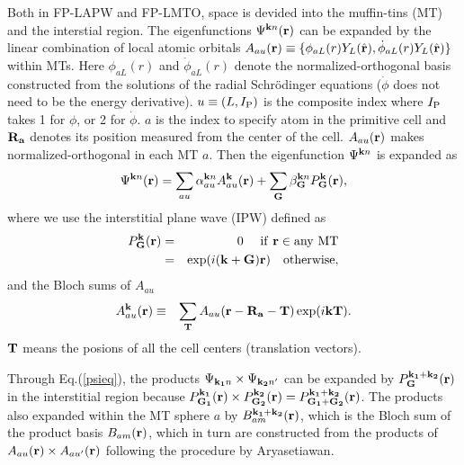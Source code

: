 \documentclass[a4paper,10pt,epsf,fleqn]{article}
\begin{document}
Both in FP-LAPW and FP-LMTO, space is devided into
the muffin-tins (MT) and the interstial region.
The eigenfunctions $\Psi^{{\bf k}n}({\bf r})$ can be
expanded by the linear combination of local atomic orbitals
$A_{au}({\bf r}) \equiv \{ \phi_{aL}(r) Y_L(\hat{\bf r}),\dot{\phi}_{aL}(r) Y_L(\hat{\bf r}) \}$
within MTs.
Here $\phi_{aL}(r)$ and $\dot{\phi}_{aL}(r)$ denote 
the normalized-orthogonal basis 
constructed from the solutions of the radial Schr\"odinger equations
($\dot{\phi}$ does not need to be the energy derivative).
$u \equiv(L, I_{\rm P})$ is the composite index
where $I_{\rm P}$ takes 1 for $\phi$, or 2 for $\dot{\phi}$.
$a$ is the index to specify atom in the primitive cell and
${\bf R_a}$ denotes its position measured from the center of the cell.
$A_{au}({\bf r})$ makes normalized-orthogonal in each MT $a$.
Then the eigenfunction $\Psi^{{\bf k}n}$ is expanded as
\begin{eqnarray}
\label{eigenfunction}
\label{psieq}
\Psi^{{\bf k}n}({\bf r}) 
= \sum_{a u} \alpha^{{\bf k} n}_{au} A^{\bf k}_{a u}({\bf r})
 + \sum_{\bf G} \beta^{{\bf k}n}_{\bf G} P^{\bf k}_{\bf G}({\bf r}),
\end{eqnarray}
where we use the interstitial plane wave (IPW) defined as
\begin{eqnarray}
P^{\bf k}_{\bf G}({\bf r}) &=& 0  \ \ \ {\rm \ if \ {\bf r} \in any \ MT} \nonumber \\
        &=&   \exp (i ({\bf k+G}) {\bf r}) \ \ \ {\rm otherwise},
\end{eqnarray}
and the Bloch sums of $A_{a u}$
\begin{eqnarray}
A^{\bf k}_{a u}({\bf r}) &\equiv& \sum_{\bf T} A_{a u}({\bf r-R_a-T}) \exp(i {\bf kT}).
\end{eqnarray}
${\bf T}$ means the posions of all the cell centers (translation vectors).

Through Eq.(\ref{psieq}), the products $\Psi_{{\bf k_1}n} \times \Psi_{{\bf k_2}n'}$ can
be expanded by $P^{\bf k_1+k_2}_{\bf G}({\bf r})$
in the interstitial region because
$P^{\bf k_1}_{\bf G_1}({\bf r}) \times P^{\bf k_2}_{\bf G_2}({\bf r})=
P^{\bf k_1+k_2}_{\bf G_1+G_2}({\bf r})$.
The products also expanded within the MT sphere $a$
by $B_{am}^{\bf k_1+k_2}({\bf r})$, which is the Bloch sum of
the product basis $B_{am}({\bf r})$, which in turn are constructed
from the products of $A_{au}({\bf r}) \times A_{au'}({\bf r})$
following the procedure by Aryasetiawan\cite{aryasetiawan94}.
\end{document}

